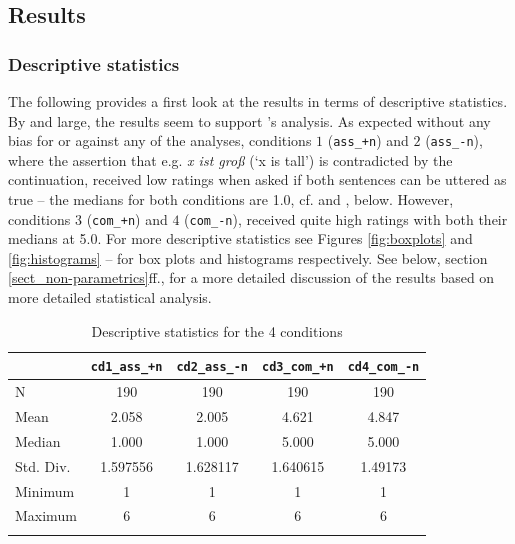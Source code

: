 \documentclass[output=paper,
modfonts
]{langscibook}
\begin{document}
\subsection{Results}

\subsubsection{Descriptive statistics}

The following provides a first look at the results in terms of descriptive statistics. By and large, the results seem to support \citeauthor{umbach2009a_comp}'s \citeyearpar{umbach2009a_comp} analysis. As expected without any bias for or against any of the analyses, conditions $1$ (\texttt{ass\_+n}) and $2$ (\texttt{\mbox{ass\_-n}}), where the assertion that e.g. \textit{x ist groß} (`x is tall') is contradicted by the continuation, received low ratings when asked if both sentences can be uttered as true -- the medians for both conditions are 1.0, cf.  and , below. However, conditions $3$ (\texttt{com\_+n}) and $4$ (\texttt{com\_-n}), received quite high ratings with both their medians at 5.0. For more descriptive statistics see Figures \ref{fig:boxplots} and \ref{fig:histograms} -- for box plots and histograms respectively. See below, section \ref{sect_non-parametrics}ff., for a more detailed discussion of the results based on more detailed statistical analysis.

\begin{table}[H]
\caption{Descriptive statistics for the 4 conditions}
\label{tab:descriptive_stats}
 \begin{tabular}{lSSSS} 
  \lsptoprule
	   & \texttt{cd1\_ass\_+n}	& \texttt{cd2\_ass\_-n}	& \texttt{cd3\_com\_+n}	& \texttt{cd4\_com\_-n}	\\ 
  \midrule
	N	        & 190		& 190		& 190		& 190		\\
	Mean	    & 2.058		& 2.005		& 4.621		& 4.847		\\
	Median	    & 1.000		& 1.000		& 5.000		& 5.000		\\
    Std. Div.	& 1.597556	& 1.628117	& 1.640615	& 1.49173	\\
	Minimum		& 1 		& 1 		& 1		    & 1		    \\
	Maximum		& 6	    	& 6	    	& 6		    & 6		    \\
  \lspbottomrule
 \end{tabular}
\end{table}
\end{document}
